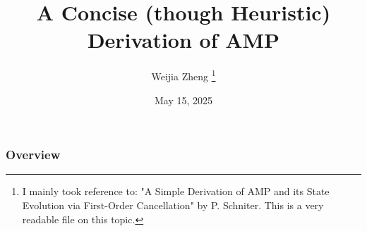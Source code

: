 \documentclass[aspectratio=43, 10pt]{beamer}
\begin{document}
\title{A Concise (though Heuristic) Derivation of AMP}
\author{Weijia Zheng 
\thanks{I mainly took reference to: "A Simple Derivation of AMP and its State Evolution via First-Order Cancellation" by P. Schniter. This is a very readable file on this topic.}
}

\date{May 15, 2025}

\setcounter{framenumber}{-1}
\frame{\titlepage}




\begin{frame}
\frametitle{Overview} %
\tableofcontents %
\end{frame}



  
\end{document}
